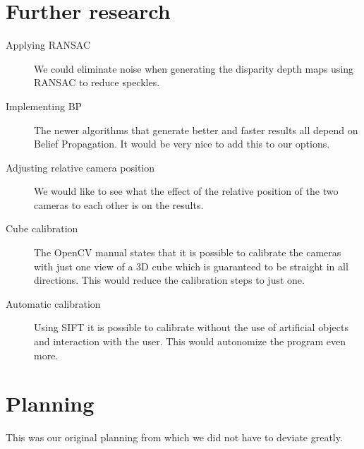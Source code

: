 \documentclass[a4paper]{article}
\begin{document}
\section{Further research}

\begin{description}
  \item[Applying RANSAC] We could eliminate noise when generating the disparity
  depth maps using RANSAC to reduce speckles.
  \item[Implementing BP] The newer algorithms that generate better and faster
  results all depend on Belief Propagation. It would be very nice to add this to
  our options.
  \item[Adjusting relative camera position] We would like to see what the effect
  of the relative position of the two cameras to each other is on the results.
  \item[Cube calibration] The OpenCV manual states that it is possible to
  calibrate the cameras with just one view of a 3D cube which is guaranteed to
  be straight in all directions. This would reduce the calibration steps to just
  one.
  \item[Automatic calibration] Using SIFT it is possible to calibrate without
  the use of artificial objects and interaction with the user. This would
  autonomize the program even more.
\end{description}

\newpage

\section{Planning}
This was our original planning from which we did not have to deviate greatly.
\end{document}
